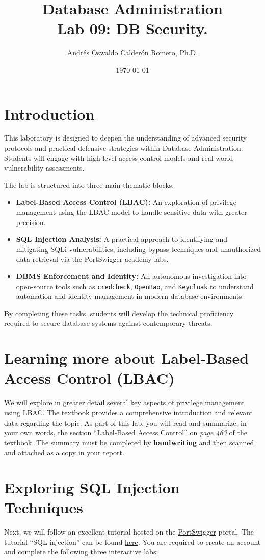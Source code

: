 \documentclass{article}
\title{Database Administration \\ Lab 09: DB Security.}
\author{Andrés Oswaldo Calderón Romero, Ph.D.}
\date{\today}
\begin{document}
\maketitle

\section{Introduction}

This laboratory is designed to deepen the understanding of advanced security protocols and practical defensive strategies within Database Administration. Students will engage with high-level access control models and real-world vulnerability assessments.

The lab is structured into three main thematic blocks:
\begin{itemize}
    \item \textbf{Label-Based Access Control (LBAC):} An exploration of privilege management using the LBAC model to handle sensitive data with greater precision.
    \item \textbf{SQL Injection Analysis:} A practical approach to identifying and mitigating SQLi vulnerabilities, including bypass techniques and unauthorized data retrieval via the PortSwigger academy labs.
    \item \textbf{DBMS Enforcement and Identity:} An autonomous investigation into open-source tools such as \texttt{credcheck}, \texttt{OpenBao}, and \texttt{Keycloak} to understand automation and identity management in modern database environments.
\end{itemize}

By completing these tasks, students will develop the technical proficiency required to secure database systems against contemporary threats.

\section{Learning more about Label-Based Access Control (LBAC)}\label{sec:lbac}
We will explore in greater detail several key aspects of privilege management using LBAC. The textbook provides a comprehensive introduction and relevant data regarding the topic. As part of this lab, you will read and summarize, in your own words, the section ``Label-Based Access Control'' on \textit{page 463} of the textbook. The summary must be completed by \textbf{\large handwriting} and then scanned and attached as a copy in your report.

\section{Exploring SQL Injection Techniques}\label{sec:sqli}
Next, we will follow an excellent tutorial hosted on the \href{https://portswigger.net/}{PortSwigger} portal. The tutorial ``SQL injection'' can be found \href{https://portswigger.net/web-security/sql-injection}{here}. You are required to create an account and complete the following three interactive labs:
\end{document}
